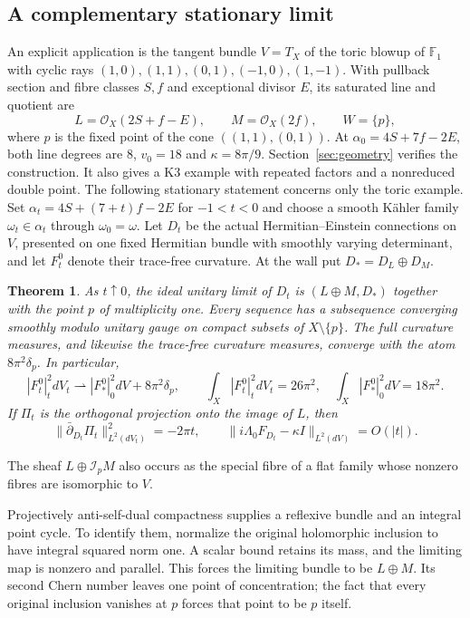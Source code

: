 \documentclass[11pt]{amsart}
\newtheorem{theorem}{Theorem}[section]
\theoremstyle{definition}
\theoremstyle{remark}
\newcommand{\cO}{\mathcal O}
\newcommand{\cI}{\mathcal I}
\newcommand{\db}{\bar\partial}
\begin{document}
\subsection{A complementary stationary limit}
An explicit application is the tangent bundle $V=T_X$ of the toric
blowup of $\mathbb F_1$ with cyclic rays
$(1,0),(1,1),(0,1),(-1,0),(1,-1)$. With pullback section and fibre
classes $S,f$ and exceptional divisor $E$, its saturated line and
quotient are
\[
 L=\cO_X(2S+f-E),\qquad M=\cO_X(2f),\qquad W=\{p\},
\]
where $p$ is the fixed point of the cone $((1,1),(0,1))$.
At $\alpha_0=4S+7f-2E$, both line degrees are $8$, $v_0=18$ and
$\kappa=8\pi/9$. Section~\ref{sec:geometry} verifies the construction.
It also gives a K3 example with repeated factors and a nonreduced double
point. The following stationary statement concerns only the toric example.
Set $\alpha_t=4S+(7+t)f-2E$ for $-1<t<0$ and choose a smooth K\"ahler
family $\omega_t\in\alpha_t$ through $\omega_0=\omega$. Let $D_t$
be the actual Hermitian--Einstein connections on $V$, presented on one
fixed Hermitian bundle with smoothly varying determinant, and let
$F_t^0$ denote their trace-free curvature. At the wall put
$D_*=D_L\oplus D_M$.

\begin{theorem}\label{thm:stationary}
As $t\uparrow0$, the ideal unitary limit of $D_t$
is $(L\oplus M,D_*)$ together with the point $p$ of multiplicity one.
Every sequence has a subsequence converging smoothly modulo unitary gauge
on compact subsets of $X\setminus\{p\}$. The full curvature measures,
and likewise the trace-free curvature measures, converge with the atom
$8\pi^2\delta_p$. In particular,
\begin{equation}\label{eq:intro-energy}
 |F_t^0|_t^2dV_t\rightharpoonup|F_*^0|_0^2dV+8\pi^2\delta_p,
 \qquad
 \int_X|F_t^0|_t^2dV_t=26\pi^2,
 \quad\int_X|F_*^0|_0^2dV=18\pi^2.
\end{equation}
If $\Pi_t$ is the orthogonal projection onto the image of $L$, then
\begin{equation}\label{eq:intro-projection}
 \|\db_{D_t}\Pi_t\|_{L^2(dV_t)}^2=-2\pi t,
 \qquad
 \|i\Lambda_0F_{D_t}-\kappa I\|_{L^2(dV)}=O(|t|).
\end{equation}
\end{theorem}

The sheaf $L\oplus\cI_pM$ also occurs as the special fibre of a flat
family whose nonzero fibres are isomorphic to $V$.

Projectively anti-self-dual compactness supplies a reflexive bundle and
an integral point cycle. To identify them, normalize the original
holomorphic inclusion to have integral squared norm one. A scalar bound
retains its mass, and the limiting map is nonzero and parallel. This
forces the limiting bundle to be $L\oplus M$. Its second Chern number
leaves one point of concentration; the fact that every original inclusion
vanishes at $p$ forces that point to be $p$ itself.
\end{document}
